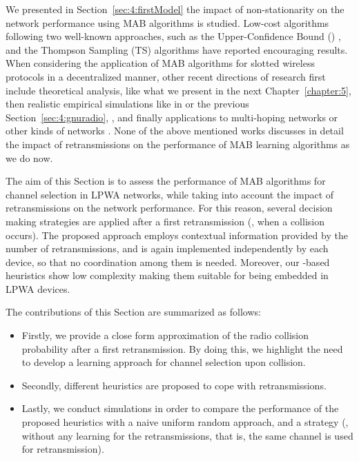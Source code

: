 We presented in Section~\ref{sec:4:firstModel} the impact of non-stationarity on the network performance using MAB algorithms is studied.
Low-cost algorithms following two well-known approaches, such as the Upper-Confidence Bound (\UCB{}) \cite{Auer02,Auer02}, and the Thompson Sampling (TS) algorithms \cite{Thompson33} have reported encouraging results.
When considering the application of MAB algorithms for slotted wireless protocols in a decentralized manner,
other recent directions of research first include theoretical analysis, like what we present in the next Chapter~\ref{chapter:5},
then realistic empirical simulations like in \cite{kumar2016two,kumar2017channel} or the previous Section~\ref{sec:4:gnuradio},
,
and finally applications to multi-hoping networks \cite{Mitton16,Toldov16} or other kinds of networks \cite{Wilhelmi19collaborative,Wilhelmi19potential}.
%
None of the above mentioned works discusses in detail the impact of retransmissions on the performance of MAB learning algorithms as we do now.

The aim of this Section is to assess the performance of MAB algorithms for channel selection in LPWA networks, while taking into account the impact of retransmissions on the network performance.
For this reason, several decision making strategies are applied after a first retransmission (\ie, when a collision occurs).
The proposed approach employs contextual information provided by the number of retransmissions, and is again implemented independently by each device, so that no coordination among them is needed.
Moreover, our \UCB{}-based heuristics show low complexity making them suitable for being embedded in LPWA devices.

The contributions of this Section are summarized as follows:
\begin{itemize}
	\item
	Firstly, we provide a close form approximation of the radio collision probability after a first retransmission.
	By doing this, we highlight the need to develop a learning approach for channel selection upon collision.

	\item
	Secondly, different heuristics are proposed to cope with retransmissions.

	\item Lastly, we conduct simulations in order to compare the performance of the proposed heuristics with a naive uniform random approach, and a \UCB{} strategy (\ie, without any learning for the retransmissions, that is, the same channel is used for retransmission).
\end{itemize}


